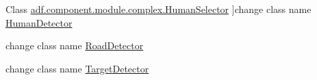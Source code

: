 \begin{DoxyRefList}
Class \hyperlink{classadf_1_1component_1_1module_1_1complex_1_1HumanSelector}{adf.component.module.complex.Human\+Selector} ]change class name \hyperlink{classadf_1_1component_1_1module_1_1complex_1_1HumanDetector}{Human\+Detector}  
\item[\label{deprecated__deprecated000015}%
\hypertarget{deprecated__deprecated000015}{}%
Class \hyperlink{classadf_1_1component_1_1module_1_1complex_1_1RoadSelector}{adf.component.module.complex.Road\+Selector} ]change class name \hyperlink{classadf_1_1component_1_1module_1_1complex_1_1RoadDetector}{Road\+Detector}  
\item[\label{deprecated__deprecated000016}%
\hypertarget{deprecated__deprecated000016}{}%
Class \hyperlink{classadf_1_1component_1_1module_1_1complex_1_1TargetSelector}{adf.component.module.complex.Target\+Selector$<$ E extends Standard\+Entity $>$} ]change class name \hyperlink{classadf_1_1component_1_1module_1_1complex_1_1TargetDetector}{Target\+Detector} 
\end{DoxyRefList}
